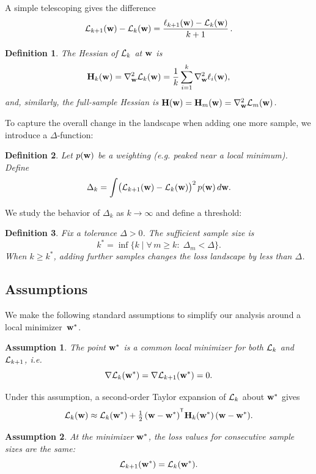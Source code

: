 \documentclass{article}
\newtheorem{definition}{Definition}
\newtheorem{assumption}{Assumption}
\begin{document}
A simple telescoping gives the difference
$$
  \mathcal{L}_{k+1}(\mathbf{w}) - \mathcal{L}_k(\mathbf{w}) =
  \frac{\ell_{k+1}(\mathbf{w}) - \mathcal{L}_k(\mathbf{w})}{k+1}\,.
$$

\begin{definition}
  The Hessian of $\mathcal{L}_k$ at $\mathbf{w}$ is
  $$
    \mathbf{H}_k(\mathbf{w}) =
    \nabla^2_{\mathbf{w}} \mathcal{L}_k(\mathbf{w}) =
    \frac1k \sum_{i=1}^k \nabla^2_{\mathbf{w}} \ell_i(\mathbf{w}),
  $$
  and, similarly, the full-sample Hessian is $\mathbf{H}(\mathbf{w}) = \mathbf{H}_m(\mathbf{w}) = \nabla^2_{\mathbf{w}} \mathcal{L}_m(\mathbf{w})$.
\end{definition}

To capture the overall change in the landscape when adding one more sample, we introduce a $\Delta$‑function:

\begin{definition}
  Let $p(\mathbf{w})$ be a weighting (e.g. peaked near a local minimum). Define
  $$
    \Delta_k =
    \int \bigl( \mathcal{L}_{k+1}(\mathbf{w}) - \mathcal{L}_k(\mathbf{w}) \bigr)^2\, p(\mathbf{w})\, d\mathbf{w}.
  $$
\end{definition}

We study the behavior of $\Delta_k$ as $k \to \infty$ and define a threshold:

\begin{definition}
  Fix a tolerance $\Delta > 0$. The \emph{sufficient sample size} is
  $$
    k^* =
    \inf \{ k \mid \forall\, m \ge k : \; \Delta_m < \Delta\}.
  $$
  When $k \ge k^*$, adding further samples changes the loss landscape by less than $\Delta$.
\end{definition}

\subsection{Assumptions}

We make the following standard assumptions to simplify our analysis around a local minimizer~$\mathbf{w}^*$.

\begin{assumption}
  The point $\mathbf{w}^*$ is a common local minimizer for both $\mathcal{L}_k$ and $\mathcal{L}_{k+1}$, i.e.
  $$
    \nabla \mathcal{L}_k(\mathbf{w}^*) =
    \nabla \mathcal{L}_{k+1}(\mathbf{w}^*) =
    0.
  $$
\end{assumption}

Under this assumption, a second‑order Taylor expansion of $\mathcal{L}_k$ about $\mathbf{w}^*$ gives
$$
  \cL_k(\bw) \approx
  \cL_k(\bw^*) + \tfrac12\, (\bw - \bw^*)^{\T} \bH_k(\bw^*)\, (\bw - \bw^*).
$$

\begin{assumption}
  At the minimizer $\mathbf{w}^*$, the loss values for consecutive sample sizes are the same:
  $$
    \mathcal{L}_{k+1}(\mathbf{w}^*) =
    \mathcal{L}_k(\mathbf{w}^*).
  $$
\end{assumption}
\end{document}
